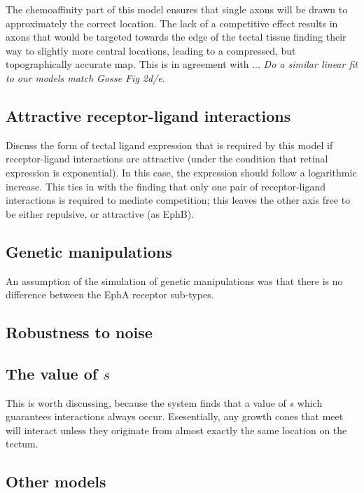 \documentclass[11pt, a4paper]{article}
\begin{document}
The chemoaffinity part of this model ensures that single axons will be drawn to approximately the correct location.
The lack of a competitive effect results in axons that would be targeted towards the edge of the tectal tissue finding their way to slightly more central locations, leading to a compressed, but topographically accurate map.
This is in agreement with \citet{gosse_retinotopic_2008}... \emph{Do a similar linear fit to our models match Gosse Fig 2d/e}.

\subsection*{Attractive receptor-ligand interactions}

Discuss the form of tectal ligand expression that is required by this model if receptor-ligand interactions are attractive (under the condition that retinal expression is exponential). In this case, the expression should follow a logarithmic increase. This ties in with the finding that only one pair of receptor-ligand interactions is required to mediate competition; this leaves the other axis free to be either repulsive, or attractive (as EphB).

\subsection*{Genetic manipulations}

 An assumption of the simulation of genetic manipulations was that there is no difference between the EphA receptor sub-types.

\subsection*{Robustness to noise}

\subsection*{The value of $s$}

This is worth discussing, because the system finds that a value of $s$ which guarantees interactions always occur. Esesentially, any growth cones that meet will interact unless they originate from almost exactly the same location on the tectum.

\subsection*{Other models}
\end{document}
